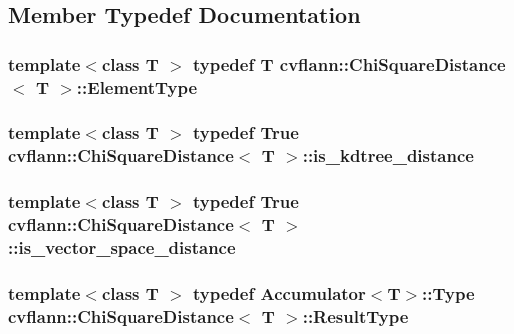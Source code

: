 \subsection{Member Typedef Documentation}
\hypertarget{structcvflann_1_1ChiSquareDistance_a20f0256af228f8a7d290ff508a87e95a}{
\subsubsection[{Element\-Type}]{\setlength{\rightskip}{0pt plus 5cm}template$<$class T $>$ typedef {\bf T} {\bf cvflann\-::\-Chi\-Square\-Distance}$<$ {\bf T} $>$\-::{\bf Element\-Type}}}\label{structcvflann_1_1ChiSquareDistance_a20f0256af228f8a7d290ff508a87e95a}
\hypertarget{structcvflann_1_1ChiSquareDistance_a79abba675ec902d1e75f3e57d5af55ea}{
\subsubsection[{is\-\_\-kdtree\-\_\-distance}]{\setlength{\rightskip}{0pt plus 5cm}template$<$class T $>$ typedef {\bf True} {\bf cvflann\-::\-Chi\-Square\-Distance}$<$ {\bf T} $>$\-::{\bf is\-\_\-kdtree\-\_\-distance}}}\label{structcvflann_1_1ChiSquareDistance_a79abba675ec902d1e75f3e57d5af55ea}
\hypertarget{structcvflann_1_1ChiSquareDistance_a408f961082255f1f8946efdc0de650ef}{
\subsubsection[{is\-\_\-vector\-\_\-space\-\_\-distance}]{\setlength{\rightskip}{0pt plus 5cm}template$<$class T $>$ typedef {\bf True} {\bf cvflann\-::\-Chi\-Square\-Distance}$<$ {\bf T} $>$\-::{\bf is\-\_\-vector\-\_\-space\-\_\-distance}}}\label{structcvflann_1_1ChiSquareDistance_a408f961082255f1f8946efdc0de650ef}
\hypertarget{structcvflann_1_1ChiSquareDistance_a5a4ba72245b30ed720d856bbd3530478}{
\subsubsection[{Result\-Type}]{\setlength{\rightskip}{0pt plus 5cm}template$<$class T $>$ typedef {\bf Accumulator}$<${\bf T}$>$\-::Type {\bf cvflann\-::\-Chi\-Square\-Distance}$<$ {\bf T} $>$\-::{\bf Result\-Type}}}\label{structcvflann_1_1ChiSquareDistance_a5a4ba72245b30ed720d856bbd3530478}


